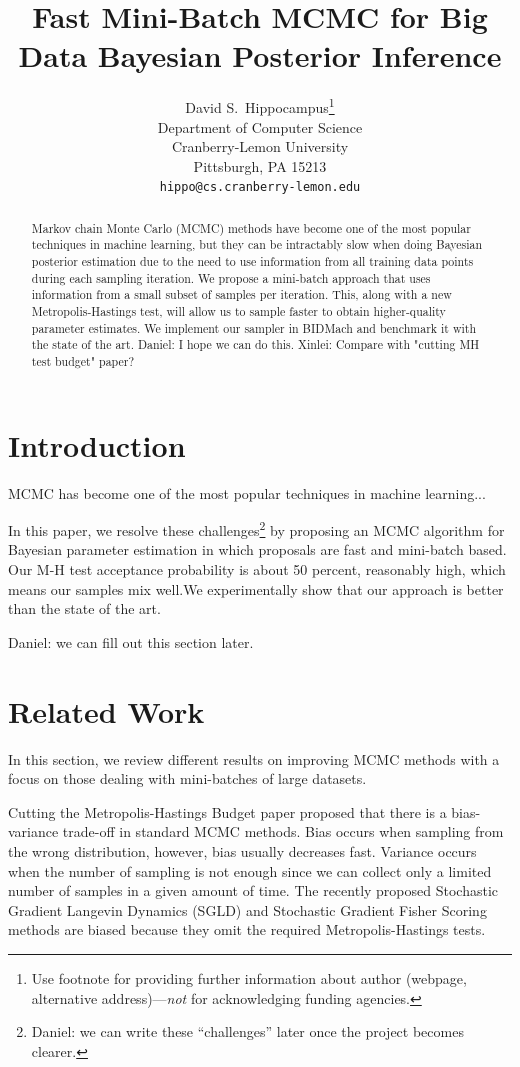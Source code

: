 \documentclass{article}
\title{Fast Mini-Batch MCMC for Big Data Bayesian Posterior Inference}
\author{
  David S.~Hippocampus\thanks{Use footnote for providing further
    information about author (webpage, alternative
    address)---\emph{not} for acknowledging funding agencies.} \\
  Department of Computer Science\\
  Cranberry-Lemon University\\
  Pittsburgh, PA 15213 \\
  \texttt{hippo@cs.cranberry-lemon.edu} \\
}
\begin{document}

\maketitle

\begin{abstract}
Markov chain Monte Carlo (MCMC) methods have become one of the most popular techniques in machine
learning, but they can be intractably slow when doing Bayesian posterior estimation due to the need
to use information from all training data points during each sampling iteration. We propose a
mini-batch approach that uses information from a small subset of samples per iteration. This, along
with a new Metropolis-Hastings test, will allow us to sample faster to obtain higher-quality
parameter estimates. We implement our sampler in BIDMach and benchmark it with the state of the art.
{\color{blue} Daniel: I hope we can do this.}
{\color{blue} Xinlei: Compare with "cutting MH test budget" paper?}
\end{abstract}

\section{Introduction}

MCMC has become one of the most popular techniques in machine learning...

In this paper, we resolve these challenges\footnote{{\color{blue} Daniel: we can write these
``challenges'' later once the project becomes clearer}.} by proposing an MCMC algorithm for
Bayesian parameter estimation in which proposals are fast and mini-batch based. Our M-H test
acceptance probability is about 50 percent, reasonably high, which means our samples mix well.We
experimentally show that our approach is better than the state of the art.

{\color{blue} Daniel: we can fill out this section later.}

\section{Related Work}

In this section, we review different results on improving MCMC methods with a focus on those dealing
with mini-batches of large datasets. 

Cutting the Metropolis-Hastings Budget paper \cite{ cutting_mh_2014} proposed that there is a bias-variance trade-off in standard MCMC methods. Bias occurs when sampling from the wrong distribution, however, bias usually decreases fast. Variance occurs when the number of sampling is not enough since we can collect only a limited number of samples in a given amount of time. The recently proposed Stochastic Gradient Langevin Dynamics (SGLD) \cite{langevin_2011} and Stochastic Gradient Fisher Scoring methods are biased because they omit the required Metropolis-Hastings tests.
\end{document}
